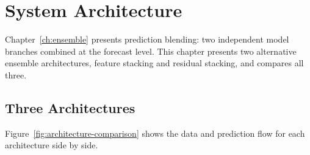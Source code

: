 \chapter{System Architecture}
\label{ch:architecture}

Chapter~\ref{ch:ensemble} presents prediction blending: two independent model branches combined at the forecast level.
This chapter presents two alternative ensemble architectures, feature stacking and residual stacking, and compares all three.


\section{Three Architectures}
\label{sec:three-architectures}

Figure~\ref{fig:architecture-comparison} shows the data and prediction flow for each architecture side by side.

